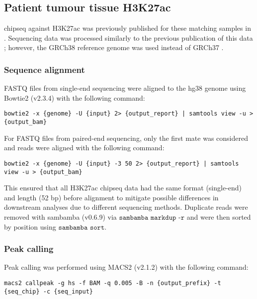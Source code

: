 \subsection{Patient tumour tissue H3K27ac }

\gls{chipseq} against H3K27ac was previously published for these matching samples in \cite{kronTMPRSS2ERGFusion2017}.
Sequencing data was processed similarly to the previous publication of this data \cite{kronTMPRSS2ERGFusion2017}; however, the GRCh38 reference genome was used instead of GRCh37 \cite{internationalhumangenomesequencingconsortiumFinishingEuchromaticSequence2004}.

\subsubsection{Sequence alignment}

FASTQ files from single-end sequencing were aligned to the hg38 genome using Bowtie2 (v2.3.4) with the following command:

\begin{lstlisting}[basicstyle=\ttfamily]
bowtie2 -x {genome} -U {input} 2> {output_report} | samtools view -u > {output_bam}
\end{lstlisting}

For FASTQ files from paired-end sequencing, only the first mate was considered and reads were aligned with the following command:

\begin{lstlisting}[basicstyle=\ttfamily]
bowtie2 -x {genome} -U {input} -3 50 2> {output_report} | samtools view -u > {output_bam}
\end{lstlisting}

This ensured that all H3K27ac \gls{chipseq} data had the same format (single-end) and length (52 bp) before alignment to mitigate possible differences in downstream analyses due to different sequencing methods.
Duplicate reads were removed with sambamba (v0.6.9) via $\texttt{sambamba markdup -r}$ and were then sorted by position using $\texttt{sambamba sort}$.

\subsubsection{Peak calling}

Peak calling was performed using MACS2 (v2.1.2) \cite{zhangModelbasedAnalysisChIPSeq2008} with the following command:

\begin{lstlisting}[basicstyle=\ttfamily]
macs2 callpeak -g hs -f BAM -q 0.005 -B -n {output_prefix} -t {seq_chip} -c {seq_input}\end{lstlisting}

